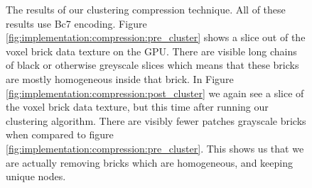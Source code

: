 \begin{figure}[H]
    \centering
    \hfill
    \caption{The results of our clustering compression technique. All of these results use Bc7 encoding. Figure \ref{fig:implementation:compression:pre_cluster} shows a slice out of the voxel brick data texture on the GPU. There are visible long chains of black or otherwise greyscale slices which means that these bricks are mostly homogeneous inside that brick. In Figure \ref{fig:implementation:compression:post_cluster} we again see a slice of the voxel brick data texture, but this time after running our clustering algorithm. There are visibly fewer patches grayscale bricks when compared to figure \ref{fig:implementation:compression:pre_cluster}. This shows us that we are actually removing bricks which are homogeneous, and keeping unique nodes.} \label{fig:implementation:compression:cluster}
\end{figure}